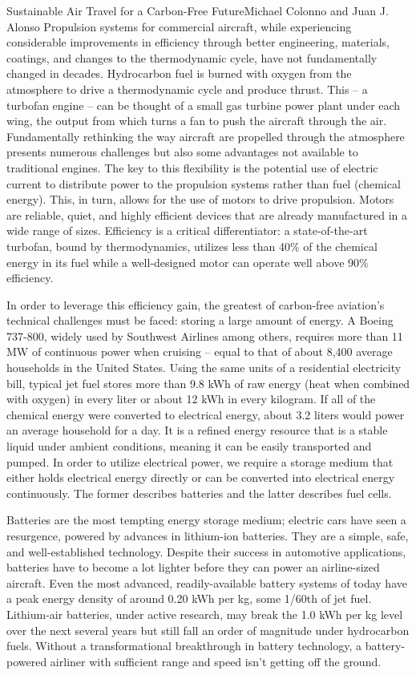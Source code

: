 \documentclass{papertex}
\begin{document}
\begin{news}{2}{Sustainable Air Travel for a Carbon-Free Future}{Michael Colonno and Juan J. Alonso}{}{}
Propulsion systems for commercial aircraft, while experiencing considerable 
improvements in efficiency through better engineering, materials, coatings, 
and changes to the thermodynamic cycle, have not fundamentally changed in 
decades. Hydrocarbon fuel is burned with oxygen from the atmosphere to drive 
a thermodynamic cycle and produce thrust. This – a turbofan engine – can be 
thought of a small gas turbine power plant under each wing, the output from 
which turns a fan to push the aircraft through the air. Fundamentally 
rethinking the way aircraft are propelled through the atmosphere presents 
numerous challenges but also some advantages not available to traditional 
engines. The key to this flexibility is the potential use of electric current 
to distribute power to the propulsion systems rather than fuel (chemical 
energy). This, in turn, allows for the use of motors to drive propulsion. 
Motors are reliable, quiet, and highly efficient devices that are already 
manufactured in a wide range of sizes. Efficiency is a critical differentiator: 
a state-of-the-art turbofan, bound by thermodynamics, utilizes less than 40\% 
of the chemical energy in its fuel while a well-designed motor can operate 
well above 90\% efficiency.

In order to leverage this efficiency gain, the greatest of carbon-free 
aviation’s technical challenges must be faced: storing a large amount of 
energy. A Boeing 737-800, widely used by Southwest Airlines among others, 
requires more than 11 MW of continuous power when cruising – equal to that 
of about 8,400 average households in the United States. Using the same units 
of a residential electricity bill, typical jet fuel stores more than 9.8 kWh 
of raw energy (heat when combined with oxygen) in every liter or about 12 kWh 
in every kilogram. If all of the chemical energy were converted to electrical 
energy, about 3.2 liters would power an average household for a day. It is a 
refined energy resource that is a stable liquid under ambient conditions, 
meaning it can be easily transported and pumped. In order to utilize 
electrical power, we require a storage medium that either holds electrical 
energy directly or can be converted into electrical energy continuously. The 
former describes batteries and the latter describes fuel cells.

Batteries are the most tempting energy storage medium; electric cars have seen 
a resurgence, powered by advances in lithium-ion batteries. They are a simple, 
safe, and well-established technology. Despite their success in automotive 
applications, batteries have to become a lot lighter before they can power an 
airline-sized aircraft. Even the most advanced, readily-available battery 
systems of today have a peak energy density of around 0.20 kWh per kg, some 
1/60th of jet fuel. Lithium-air batteries, under active research, may break 
the 1.0 kWh per kg level over the next several years but still fall an order 
of magnitude under hydrocarbon fuels. Without a transformational breakthrough 
in battery technology, a battery-powered airliner with sufficient range and 
speed isn’t getting off the ground.


\end{news}
\end{document}
